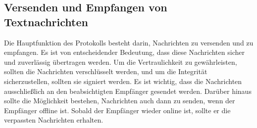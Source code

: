 \subsection{Versenden und Empfangen von Textnachrichten}

Die Hauptfunktion des Protokolls besteht darin, Nachrichten zu versenden und zu empfangen. Es ist von entscheidender Bedeutung, dass diese Nachrichten sicher und zuverlässig übertragen werden. Um die Vertraulichkeit zu gewährleisten, sollten die Nachrichten verschlüsselt werden, und um die Integrität sicherzustellen, sollten sie signiert werden. Es ist wichtig, dass die Nachrichten ausschließlich an den beabsichtigten Empfänger gesendet werden. Darüber hinaus sollte die Möglichkeit bestehen, Nachrichten auch dann zu senden, wenn der Empfänger offline ist. Sobald der Empfänger wieder online ist, sollte er die verpassten Nachrichten erhalten.
